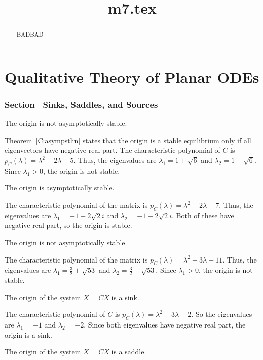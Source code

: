 \documentclass{ximera}
\title{m7.tex}
\begin{document}
\begin{abstract}
BADBAD
\end{abstract}
\maketitle

\chapter{Qualitative Theory of Planar ODEs}

\subsection*{Section~\protect{\ref{S:6.7}} Sinks, Saddles, and Sources}

 \ans The origin is not asymptotically stable.

\soln Theorem~\ref{C:asympstlin} states that the origin is a stable
equilibrium only if all eigenvectors have negative real part.  The
characteristic polynomial of $C$ is $p_C(\lambda) = \lambda^2 - 2\lambda
- 5$.  Thus, the eigenvalues are $\lambda_1 = 1 + \sqrt{6}$ and
$\lambda_2 = 1 - \sqrt{6}$. Since $\lambda_1 > 0$, the origin
is not stable.

 \ans The origin is asymptotically stable.

\soln The characteristic polynomial of the matrix is $p_C(\lambda) =
\lambda^2 + 2\lambda + 7$.  Thus, the eigenvalues are $\lambda_1 =
-1 + 2\sqrt{2}i$ and $\lambda_2 = -1 - 2\sqrt{2}i$.  Both of these
have negative real part, so the origin is stable.

 \ans The origin is not asymptotically stable.

\soln The characteristic polynomial of the matrix is $p_C(\lambda) =
\lambda^2 - 3\lambda - 11$.  Thus, the eigenvalues are $\lambda_1 =
\frac{3}{2} + \sqrt{53}$ and $\lambda_2 = \frac{3}{2} - \sqrt{53}$.
Since $\lambda_1 > 0$, the origin is not stable.

 \ans The origin of the system $\dot{X} = CX$ is a sink.

\soln The characteristic polynomial of $C$ is
$p_C(\lambda) = \lambda^2 + 3\lambda + 2$.  So the eigenvalues are
$\lambda_1 = -1$ and $\lambda_2 = -2$.  Since both eigenvalues have
negative real part, the origin is a sink.

 \ans The origin of the system $\dot{X} = CX$ is a saddle.
\end{document}
